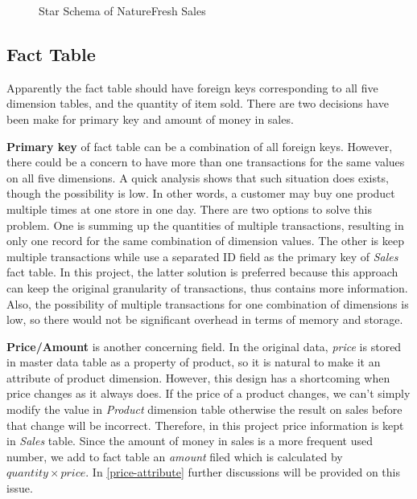 \documentclass[
  a4paper,
]{article}
\begin{document}
\begin{figure}[htbp]
  \centering
  {
  \fontsize{9}{10}\selectfont
  \def\svgwidth{0.9\columnwidth}
    \resizebox{0.9\textwidth}{!}{}
  }
  \caption{Star Schema of NatureFresh Sales}
  \label{fig:overall}
\end{figure}

\hypertarget{fact-table}{%
\subsection{Fact Table}\label{fact-table}}

Apparently the fact table should have foreign keys corresponding to all
five dimension tables, and the quantity of item sold. There are two
decisions have been make for primary key and amount of money in sales.

\textbf{Primary key} of fact table can be a combination of all foreign
keys. However, there could be a concern to have more than one
transactions for the same values on all five dimensions. A quick
analysis shows that such situation does exists, though the possibility
is low. In other words, a customer may buy one product multiple times at
one store in one day. There are two options to solve this problem. One
is summing up the quantities of multiple transactions, resulting in only
one record for the same combination of dimension values. The other is
keep multiple transactions while use a separated ID field as the primary
key of \emph{Sales} fact table. In this project, the latter solution is
preferred because this approach can keep the original granularity of
transactions, thus contains more information. Also, the possibility of
multiple transactions for one combination of dimensions is low, so there
would not be significant overhead in terms of memory and storage.

\textbf{Price/Amount} is another concerning field. In the original data,
\emph{price} is stored in master data table as a property of product, so
it is natural to make it an attribute of product dimension. However,
this design has a shortcoming when price changes as it always does. If
the price of a product changes, we can't simply modify the value in
\emph{Product} dimension table otherwise the result on sales before that
change will be incorrect. Therefore, in this project price information
is kept in \emph{Sales} table. Since the amount of money in sales is a
more frequent used number, we add to fact table an \emph{amount} filed
which is calculated by \(\mathit{quantity}\times \mathit{price}\). In
\cref{price-attribute} further discussions will be provided on this
issue.
\end{document}
